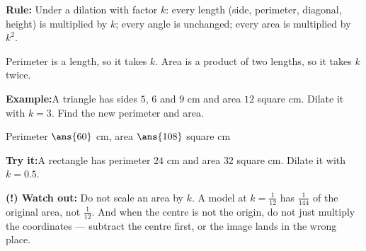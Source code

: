 \documentclass[12pt]{article}
\begin{document}
\begin{formulabox}
\textbf{Rule:} Under a dilation with factor $k$: every length (side, perimeter,
diagonal, height) is multiplied by $k$; every angle is unchanged; every area is
multiplied by $k^2$.\par
Perimeter is a length, so it takes $k$. Area is a product of two lengths, so it
takes $k$ twice.
\end{formulabox}
\begin{examplebox}
\textbf{Example:}\quad A triangle has sides $5$, $6$ and $9$ cm and area $12$
square cm. Dilate it with $k = 3$. Find the new perimeter and area.

Perimeter $\ans{60}$ cm, area $\ans{108}$ square cm
\end{examplebox}
\begin{tryitbox}
\textbf{Try it:}\quad A rectangle has perimeter $24$ cm and area $32$ square
cm. Dilate it with $k = 0.5$.\\[2pt]
\end{tryitbox}

\begin{watchoutbox}
\textbf{(!) Watch out:} Do not scale an area by $k$. A model at
$k = \frac{1}{12}$ has $\frac{1}{144}$ of the original area, not
$\frac{1}{12}$. And when the centre is not the origin, do not just multiply the
coordinates --- subtract the centre first, or the image lands in the wrong
place.
\end{watchoutbox}
\end{document}
